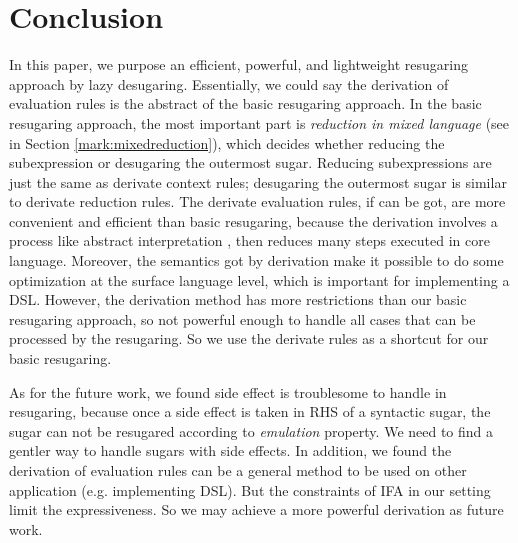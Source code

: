 \section{Conclusion}
\label{sec7}


In this paper, we purpose an efficient, powerful, and lightweight resugaring approach by lazy desugaring. Essentially, we could say the derivation of evaluation rules is the abstract of the basic resugaring approach. In the basic resugaring approach, the most important part is \emph{reduction in mixed language} (see in Section \ref{mark:mixedreduction}), which decides whether reducing the subexpression or desugaring the outermost sugar. Reducing subexpressions are just the same as derivate context rules; desugaring the outermost sugar is similar to derivate reduction rules. The derivate evaluation rules, if can be got, are more convenient and efficient than  basic resugaring, because the derivation involves a process like abstract interpretation \cite{AbstractInterpretation}, then reduces many steps executed in core language. Moreover, the semantics got by derivation make it possible to do some optimization at the surface language level, which is important for implementing a DSL. However, the derivation method has more restrictions than our basic resugaring approach, so not powerful enough to handle all cases that can be processed by the resugaring. So we use the derivate rules as a shortcut for our basic resugaring.

As for the future work, we found side effect is troublesome to handle in resugaring, because once a side effect is taken in RHS of a syntactic sugar, the sugar can not be resugared according to \emph{emulation} property. We need to find a gentler way to handle sugars with side effects. In addition, we found the derivation of evaluation rules can be a general method to be used on other application (e.g. implementing DSL). But the constraints of IFA in our setting limit the expressiveness. So we may achieve a more powerful derivation as future work.